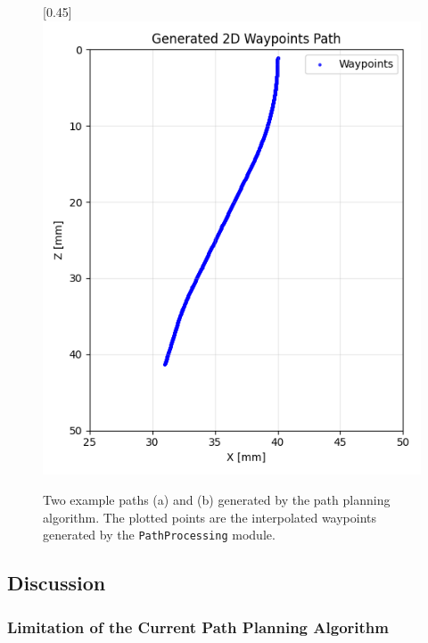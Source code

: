 \begin{figure}[H]
\begin{subcaptionbox}{\label{fig:right}}[0.45\linewidth]
        {\includegraphics[width=\linewidth]{images/waypoints/Figure_1.png}}
    \end{subcaptionbox}
    \caption{Two example paths (a) and (b) generated by the path planning algorithm. The plotted points are the interpolated waypoints generated by the \texttt{PathProcessing} module.}
    \label{fig:waypoints}
\end{figure}

\subsection{Discussion}
\subsubsection{Limitation of the Current Path Planning Algorithm}

